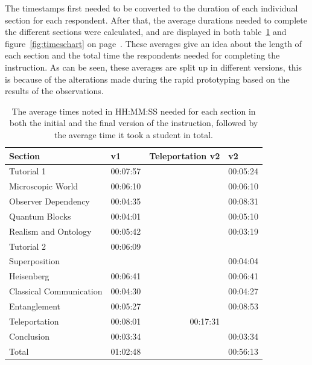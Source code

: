 \documentclass[11pt,twoside]{report} %
\begin{document}
The timestamps first needed to be converted to the duration of each individual section for each respondent. After that, the average durations needed to complete the different sections were calculated, and are displayed in both table~\ref{tab:timetable} and figure~\ref{fig:timeschart} on page~\pageref{fig:timeschart}. These averages give an idea about the length of each section and the total time the respondents needed for completing the instruction. As can be seen, these averages are split up in different versions, this is because of the alterations made during the rapid prototyping based on the results of the observations.

\begin{table}[htbp]
\begin{center}
\begin{tabular}{|l|r|l|r|}
\hline
Section & \multicolumn{1}{l|}{v1} & Teleportation v2 & \multicolumn{1}{l|}{v2} \\ \hline
Tutorial 1 & 00:07:57 &  & 00:05:24 \\ \hline
Microscopic World & 00:06:10 &  & 00:06:10 \\ \hline
Observer Dependency & 00:04:35 &  & 00:08:31 \\ \hline
Quantum Blocks & 00:04:01 &  & 00:05:10 \\ \hline
Realism and Ontology & 00:05:42 &  & 00:03:19 \\ \hline
Tutorial 2 & 00:06:09 &  & \multicolumn{1}{l|}{} \\ \hline
Superposition & \multicolumn{1}{l|}{} &  & 00:04:04 \\ \hline
Heisenberg & 00:06:41 &  & 00:06:41 \\ \hline
Classical Communication & 00:04:30 &  & 00:04:27 \\ \hline
Entanglement & 00:05:27 &  & 00:08:53 \\ \hline
Teleportation & 00:08:01 & \multicolumn{1}{r|}{00:17:31} & \multicolumn{1}{l|}{} \\ \hline
Conclusion & 00:03:34 &  & 00:03:34 \\ \hline
Total & 01:02:48 &  & 00:56:13 \\ \hline
\end{tabular}
\caption{The average times noted in HH:MM:SS needed for each section in both the initial and the final version of the instruction, followed by the average time it took a student in total.\label{tab:timetable}}
\end{center}
\end{table}
\end{document}
